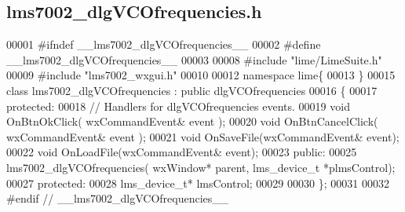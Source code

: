 \subsection{lms7002\+\_\+dlg\+V\+C\+Ofrequencies.\+h}
\label{lms7002__dlgVCOfrequencies_8h_source}

\begin{DoxyCode}
00001 \textcolor{preprocessor}{#ifndef \_\_lms7002\_dlgVCOfrequencies\_\_}
00002 \textcolor{preprocessor}{#define \_\_lms7002\_dlgVCOfrequencies\_\_}
00003 
00008 \textcolor{preprocessor}{#include "lime/LimeSuite.h"}
00009 \textcolor{preprocessor}{#include "lms7002_wxgui.h"}
00010 
00012 \textcolor{keyword}{namespace }lime\{
00013 \}
00015 \textcolor{keyword}{class }lms7002_dlgVCOfrequencies : \textcolor{keyword}{public} dlgVCOfrequencies
00016 \{
00017     \textcolor{keyword}{protected}:
00018         \textcolor{comment}{// Handlers for dlgVCOfrequencies events.}
00019         \textcolor{keywordtype}{void} OnBtnOkClick( wxCommandEvent& event );
00020         \textcolor{keywordtype}{void} OnBtnCancelClick( wxCommandEvent& event );
00021         \textcolor{keywordtype}{void} OnSaveFile(wxCommandEvent& event);
00022         \textcolor{keywordtype}{void} OnLoadFile(wxCommandEvent& event);
00023     \textcolor{keyword}{public}:
00025         lms7002_dlgVCOfrequencies( wxWindow* parent, lms_device_t *plmsControl);
00027 \textcolor{keyword}{protected}:
00028     lms_device_t* lmsControl;
00029     
00030 \};
00031 
00032 \textcolor{preprocessor}{#endif // \_\_lms7002\_dlgVCOfrequencies\_\_}
\end{DoxyCode}
